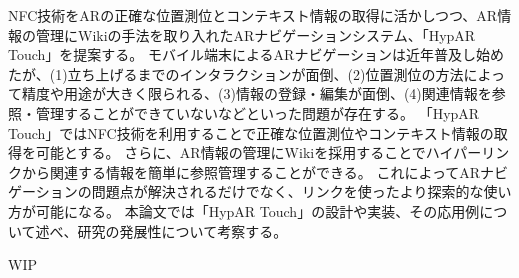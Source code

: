 


\begin{jabstract}
NFC技術をARの正確な位置測位とコンテキスト情報の取得に活かしつつ、AR情報の管理にWikiの手法を取り入れたARナビゲーションシステム、「HypAR Touch」を提案する。
モバイル端末によるARナビゲーションは近年普及し始めたが、(1)立ち上げるまでのインタラクションが面倒、(2)位置測位の方法によって精度や用途が大きく限られる、(3)情報の登録・編集が面倒、(4)関連情報を参照・管理することができていないなどといった問題が存在する。
「HypAR Touch」ではNFC技術を利用することで正確な位置測位やコンテキスト情報の取得を可能とする。
さらに、AR情報の管理にWikiを採用することでハイパーリンクから関連する情報を簡単に参照管理することができる。
これによってARナビゲーションの問題点が解決されるだけでなく、リンクを使ったより探索的な使い方が可能になる。
本論文では「HypAR Touch」の設計や実装、その応用例について述べ、研究の発展性について考察する。
\end{jabstract}



\begin{eabstract}

WIP

\end{eabstract}
